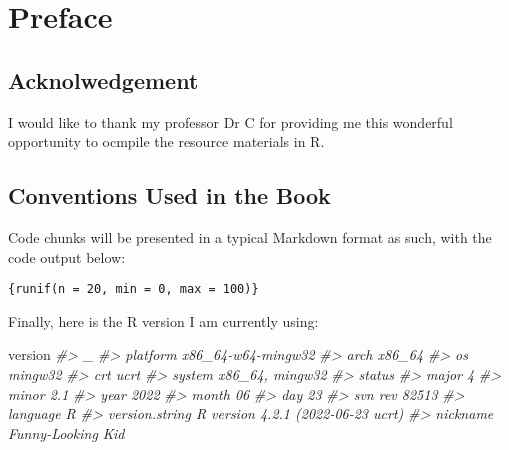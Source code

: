 \documentclass[
]{book}
\newenvironment{Shaded}{\begin{snugshade}}{\end{snugshade}}
\newcommand{\CommentTok}[1]{\textcolor[rgb]{0.56,0.35,0.01}{\textit{#1}}}
\newcommand{\NormalTok}[1]{#1}
\begin{document}
\hypertarget{preface}{%
\chapter*{Preface}\label{preface}}

\hypertarget{acknolwedgement}{%
\section{Acknolwedgement}\label{acknolwedgement}}

I would like to thank my professor Dr C for providing me this wonderful opportunity to ocmpile the resource materials in R.

\hypertarget{conventions-used-in-the-book}{%
\section{Conventions Used in the Book}\label{conventions-used-in-the-book}}

Code chunks will be presented in a typical Markdown format as such, with the code output below:

\texttt{\{runif(n\ =\ 20,\ min\ =\ 0,\ max\ =\ 100)\}}

Finally, here is the R version I am currently using:

\begin{Shaded}
\begin{Highlighting}[]
\NormalTok{version}
\CommentTok{\#\textgreater{}                \_                                }
\CommentTok{\#\textgreater{} platform       x86\_64{-}w64{-}mingw32               }
\CommentTok{\#\textgreater{} arch           x86\_64                           }
\CommentTok{\#\textgreater{} os             mingw32                          }
\CommentTok{\#\textgreater{} crt            ucrt                             }
\CommentTok{\#\textgreater{} system         x86\_64, mingw32                  }
\CommentTok{\#\textgreater{} status                                          }
\CommentTok{\#\textgreater{} major          4                                }
\CommentTok{\#\textgreater{} minor          2.1                              }
\CommentTok{\#\textgreater{} year           2022                             }
\CommentTok{\#\textgreater{} month          06                               }
\CommentTok{\#\textgreater{} day            23                               }
\CommentTok{\#\textgreater{} svn rev        82513                            }
\CommentTok{\#\textgreater{} language       R                                }
\CommentTok{\#\textgreater{} version.string R version 4.2.1 (2022{-}06{-}23 ucrt)}
\CommentTok{\#\textgreater{} nickname       Funny{-}Looking Kid}
\end{Highlighting}
\end{Shaded}
\end{document}
